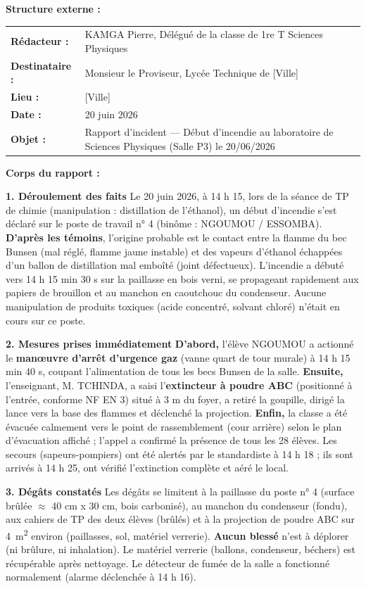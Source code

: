 \documentclass[11pt]{article}
\begin{document}
\begin{exemplebox}
\textbf{Structure externe :}
\begin{tabularx}{\linewidth}{lX}
\textbf{Rédacteur :} & KAMGA Pierre, Délégué de la classe de 1re T Sciences Physiques \\
\textbf{Destinataire :} & Monsieur le Proviseur, Lycée Technique de [Ville] \\
\textbf{Lieu :} & [Ville] \\
\textbf{Date :} & 20 juin 2026 \\
\textbf{Objet :} & Rapport d'incident — Début d'incendie au laboratoire de Sciences Physiques (Salle P3) le 20/06/2026
\end{tabularx}

\textbf{Corps du rapport :}

\textbf{1. Déroulement des faits}
Le 20 juin 2026, à 14 h 15, lors de la séance de TP de chimie (manipulation : distillation de l'éthanol), un début d'incendie s'est déclaré sur le poste de travail n° 4 (binôme : NGOUMOU / ESSOMBA). \textbf{D'après les témoins}, l'origine probable est le contact entre la flamme du bec Bunsen (mal réglé, flamme jaune instable) et des vapeurs d'éthanol échappées d'un ballon de distillation mal emboîté (joint défectueux). L'incendie a débuté vers 14 h 15 min 30 s sur la paillasse en bois verni, se propageant rapidement aux papiers de brouillon et au manchon en caoutchouc du condenseur. Aucune manipulation de produits toxiques (acide concentré, solvant chloré) n'était en cours sur ce poste.

\textbf{2. Mesures prises immédiatement}
\textbf{D'abord,} l'élève NGOUMOU a actionné le \textbf{manœuvre d'arrêt d'urgence gaz} (vanne quart de tour murale) à 14 h 15 min 40 s, coupant l'alimentation de tous les becs Bunsen de la salle. \textbf{Ensuite,} l'enseignant, M. TCHINDA, a saisi l'\textbf{extincteur à poudre ABC} (positionné à l'entrée, conforme NF EN 3) situé à 3 m du foyer, a retiré la goupille, dirigé la lance vers la base des flammes et déclenché la projection. \textbf{Enfin,} la classe a été évacuée calmement vers le point de rassemblement (cour arrière) selon le plan d'évacuation affiché ; l'appel a confirmé la présence de tous les 28 élèves. Les secours (sapeurs-pompiers) ont été alertés par le standardiste à 14 h 18 ; ils sont arrivés à 14 h 25, ont vérifié l'extinction complète et aéré le local.

\textbf{3. Dégâts constatés}
Les dégâts se limitent à la paillasse du poste n° 4 (surface brûlée $\approx$ 40 cm x 30 cm, bois carbonisé), au manchon du condenseur (fondu), aux cahiers de TP des deux élèves (brûlés) et à la projection de poudre ABC sur \SI{4}{\square\meter} environ (paillasses, sol, matériel verrerie). \textbf{Aucun blessé} n'est à déplorer (ni brûlure, ni inhalation). Le matériel verrerie (ballons, condenseur, béchers) est récupérable après nettoyage. Le détecteur de fumée de la salle a fonctionné normalement (alarme déclenchée à 14 h 16).


\end{exemplebox}
\end{document}
